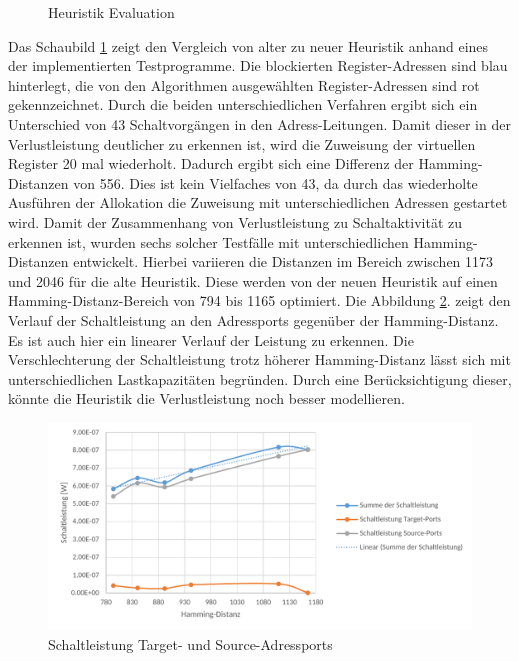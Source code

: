 \begin{figure}[H] 
	\centering
	
	\caption{Heuristik Evaluation}
	\label{fig:heuristik_eval}
\end{figure}
Das Schaubild \ref{fig:heuristik_eval} zeigt den Vergleich von alter zu neuer Heuristik anhand eines der implementierten Testprogramme. Die blockierten Register-Adressen sind blau hinterlegt, die von den Algorithmen ausgewählten Register-Adressen sind rot gekennzeichnet. Durch die beiden unterschiedlichen Verfahren ergibt sich ein Unterschied von 43 Schaltvorgängen in den Adress-Leitungen. Damit dieser in der Verlustleistung deutlicher zu erkennen ist, wird die Zuweisung der virtuellen Register 20 mal wiederholt. Dadurch ergibt sich eine Differenz der Hamming-Distanzen von 556. Dies ist kein Vielfaches von 43, da durch das wiederholte Ausführen der Allokation die Zuweisung mit unterschiedlichen Adressen gestartet wird.
Damit der Zusammenhang von Verlustleistung zu Schaltaktivität zu erkennen ist, wurden sechs solcher Testfälle mit unterschiedlichen Hamming-Distanzen entwickelt. Hierbei variieren die Distanzen im Bereich zwischen 1173 und 2046 für die alte Heuristik. Diese werden von der neuen Heuristik auf einen Hamming-Distanz-Bereich von 794 bis 1165 optimiert.
Die Abbildung \ref{fig:schaltleistung_heuristic}. zeigt den Verlauf der Schaltleistung an den Adressports gegenüber der Hamming-Distanz. Es ist auch hier ein linearer Verlauf der Leistung zu erkennen. Die Verschlechterung der Schaltleistung trotz höherer Hamming-Distanz lässt sich mit unterschiedlichen Lastkapazitäten begründen. Durch eine Berücksichtigung dieser, könnte die Heuristik die Verlustleistung noch besser modellieren. 
\begin{figure}[H]
	\centering
	\includegraphics[width=\textwidth]{fig/schaltleistung_heuristic.pdf}
	\caption{Schaltleistung Target- und Source-Adressports}
	\label{fig:schaltleistung_heuristic}
\end{figure}

